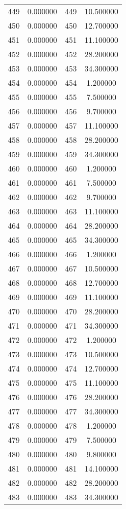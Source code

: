\documentclass[12pt]{article}
\begin{document}
\begin{longtable}{@{}cccc@{}}
449 & 0.000000 & 449 & 10.500000 \\
450 & 0.000000 & 450 & 12.700000 \\
451 & 0.000000 & 451 & 11.100000 \\
452 & 0.000000 & 452 & 28.200000 \\
453 & 0.000000 & 453 & 34.300000 \\
454 & 0.000000 & 454 & 1.200000 \\
455 & 0.000000 & 455 & 7.500000 \\
456 & 0.000000 & 456 & 9.700000 \\
457 & 0.000000 & 457 & 11.100000 \\
458 & 0.000000 & 458 & 28.200000 \\
459 & 0.000000 & 459 & 34.300000 \\
460 & 0.000000 & 460 & 1.200000 \\
461 & 0.000000 & 461 & 7.500000 \\
462 & 0.000000 & 462 & 9.700000 \\
463 & 0.000000 & 463 & 11.100000 \\
464 & 0.000000 & 464 & 28.200000 \\
465 & 0.000000 & 465 & 34.300000 \\
466 & 0.000000 & 466 & 1.200000 \\
467 & 0.000000 & 467 & 10.500000 \\
468 & 0.000000 & 468 & 12.700000 \\
469 & 0.000000 & 469 & 11.100000 \\
470 & 0.000000 & 470 & 28.200000 \\
471 & 0.000000 & 471 & 34.300000 \\
472 & 0.000000 & 472 & 1.200000 \\
473 & 0.000000 & 473 & 10.500000 \\
474 & 0.000000 & 474 & 12.700000 \\
475 & 0.000000 & 475 & 11.100000 \\
476 & 0.000000 & 476 & 28.200000 \\
477 & 0.000000 & 477 & 34.300000 \\
478 & 0.000000 & 478 & 1.200000 \\
479 & 0.000000 & 479 & 7.500000 \\
480 & 0.000000 & 480 & 9.800000 \\
481 & 0.000000 & 481 & 14.100000 \\
482 & 0.000000 & 482 & 28.200000 \\
483 & 0.000000 & 483 & 34.300000 \\

\end{longtable}
\end{document}
